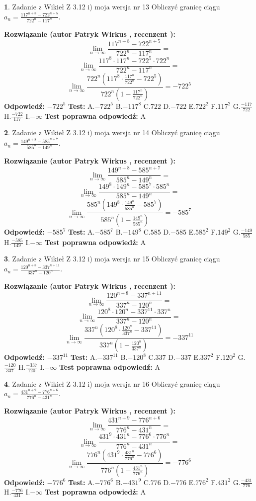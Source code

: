 \documentclass[12pt, a4paper]{article}
\theoremstyle{definition} %
\newtheorem{zad}{}
\newcommand{\zadStart}[1]{\begin{zad}#1\newline}
\newcommand{\zadStop}{\end{zad}}
\newcommand{\rozwStart}[2]{\noindent \textbf{Rozwiązanie (autor #1 , recenzent #2): }\newline}
\newcommand{\rozwStop}{\newline}
\newcommand{\odpStart}{\noindent \textbf{Odpowiedź:}\newline}
\newcommand{\odpStop}{\newline}
\newcommand{\testStart}{\noindent \textbf{Test:}\newline}
\newcommand{\testStop}{\newline}
\newcommand{\kluczStart}{\noindent \textbf{Test poprawna odpowiedź:}\newline}
\newcommand{\kluczStop}{\newline}
\begin{document}
\zadStart{Zadanie z Wikieł Z 3.12 i) moja wersja nr 13}
Obliczyć granicę ciągu $a_{n}=\frac{117^{n+8} - 722^{n+5}}{722^{n}-117^{n}}$.
\zadStop
\rozwStart{Patryk Wirkus}{}
$$\lim\limits_{n\to\infty}\frac{117^{n+8} - 722^{n+5}}{722^{n}-117^{n}}=$$
$$\lim\limits_{n\to\infty}\frac{117^{8} \cdot 117^{n} - 722^{5} \cdot 722^{n}}{722^{n}-117^{n}}=$$
$$\lim\limits_{n\to\infty}\frac{722^{n}(117^{8} \cdot \frac{117^{n}}{722^{n}} - 722^{5})}{722^{n}(1-\frac{117^{n}}{722^{n}})} = -722^{5}$$
\rozwStop
\odpStart
$-722^{5}$
\odpStop
\testStart
A.$-722^{5}$
B.$-117^{8}$
C.$722$
D.$-722$
E.$722^{2}$
F.$117^{2}$
G.$\frac{-117}{722}$
H.$\frac{-722}{117}$
I.$-\infty$
\testStop
\kluczStart
A
\kluczStop



\zadStart{Zadanie z Wikieł Z 3.12 i) moja wersja nr 14}
Obliczyć granicę ciągu $a_{n}=\frac{149^{n+8} - 585^{n+7}}{585^{n}-149^{n}}$.
\zadStop
\rozwStart{Patryk Wirkus}{}
$$\lim\limits_{n\to\infty}\frac{149^{n+8} - 585^{n+7}}{585^{n}-149^{n}}=$$
$$\lim\limits_{n\to\infty}\frac{149^{8} \cdot 149^{n} - 585^{7} \cdot 585^{n}}{585^{n}-149^{n}}=$$
$$\lim\limits_{n\to\infty}\frac{585^{n}(149^{8} \cdot \frac{149^{n}}{585^{n}} - 585^{7})}{585^{n}(1-\frac{149^{n}}{585^{n}})} = -585^{7}$$
\rozwStop
\odpStart
$-585^{7}$
\odpStop
\testStart
A.$-585^{7}$
B.$-149^{8}$
C.$585$
D.$-585$
E.$585^{2}$
F.$149^{2}$
G.$\frac{-149}{585}$
H.$\frac{-585}{149}$
I.$-\infty$
\testStop
\kluczStart
A
\kluczStop



\zadStart{Zadanie z Wikieł Z 3.12 i) moja wersja nr 15}
Obliczyć granicę ciągu $a_{n}=\frac{120^{n+8} - 337^{n+11}}{337^{n}-120^{n}}$.
\zadStop
\rozwStart{Patryk Wirkus}{}
$$\lim\limits_{n\to\infty}\frac{120^{n+8} - 337^{n+11}}{337^{n}-120^{n}}=$$
$$\lim\limits_{n\to\infty}\frac{120^{8} \cdot 120^{n} - 337^{11} \cdot 337^{n}}{337^{n}-120^{n}}=$$
$$\lim\limits_{n\to\infty}\frac{337^{n}(120^{8} \cdot \frac{120^{n}}{337^{n}} - 337^{11})}{337^{n}(1-\frac{120^{n}}{337^{n}})} = -337^{11}$$
\rozwStop
\odpStart
$-337^{11}$
\odpStop
\testStart
A.$-337^{11}$
B.$-120^{8}$
C.$337$
D.$-337$
E.$337^{2}$
F.$120^{2}$
G.$\frac{-120}{337}$
H.$\frac{-337}{120}$
I.$-\infty$
\testStop
\kluczStart
A
\kluczStop



\zadStart{Zadanie z Wikieł Z 3.12 i) moja wersja nr 16}
Obliczyć granicę ciągu $a_{n}=\frac{431^{n+9} - 776^{n+6}}{776^{n}-431^{n}}$.
\zadStop
\rozwStart{Patryk Wirkus}{}
$$\lim\limits_{n\to\infty}\frac{431^{n+9} - 776^{n+6}}{776^{n}-431^{n}}=$$
$$\lim\limits_{n\to\infty}\frac{431^{9} \cdot 431^{n} - 776^{6} \cdot 776^{n}}{776^{n}-431^{n}}=$$
$$\lim\limits_{n\to\infty}\frac{776^{n}(431^{9} \cdot \frac{431^{n}}{776^{n}} - 776^{6})}{776^{n}(1-\frac{431^{n}}{776^{n}})} = -776^{6}$$
\rozwStop
\odpStart
$-776^{6}$
\odpStop
\testStart
A.$-776^{6}$
B.$-431^{9}$
C.$776$
D.$-776$
E.$776^{2}$
F.$431^{2}$
G.$\frac{-431}{776}$
H.$\frac{-776}{431}$
I.$-\infty$
\testStop
\kluczStart
A
\kluczStop
\end{document}
